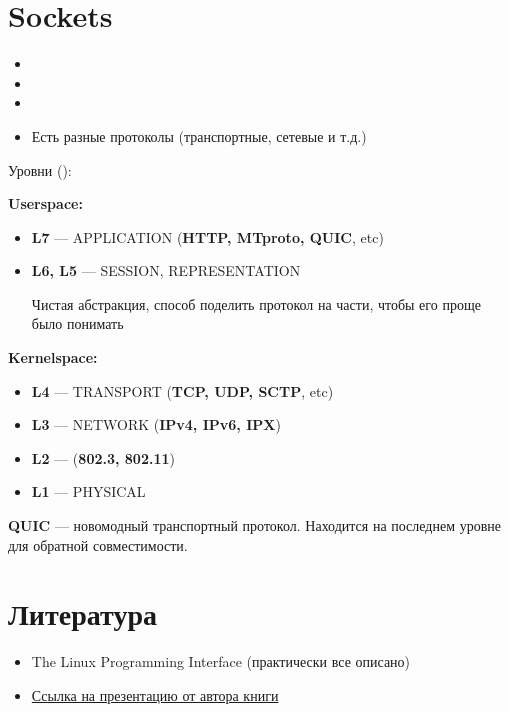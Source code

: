 \documentclass[../../lectures.tex]{subfiles}
\begin{document}
\newpage
\section{Sockets}
\begin{itemize}
    \item {}
    \item {}
    \item {}
    \item Есть разные протоколы (транспортные, сетевые и т.д.)
\end{itemize}
Уровни ():

\textbf{Userspace:}
\begin{itemize}
    \item \textbf{L7} --- APPLICATION (\textbf{HTTP, MTproto, QUIC}, etc)
    \item \textbf{L6, L5} --- SESSION, REPRESENTATION

          Чистая абстракция, способ поделить протокол на части, чтобы его проще было понимать
\end{itemize}

\textbf{Kernelspace:}
\begin{itemize}
    \item \textbf{L4} --- TRANSPORT (\textbf{TCP, UDP, SCTP}, etc)
    \item \textbf{L3} --- NETWORK (\textbf{IPv4, IPv6, IPX})
    \item \textbf{L2} ---  (\textbf{802.3, 802.11})
    \item \textbf{L1} --- PHYSICAL
\end{itemize}

\textbf{QUIC} --- новомодный транспортный протокол. Находится на последнем уровне для обратной совместимости.

\newpage
\section{Литература}
\begin{itemize}
    \item The Linux Programming Interface (практически все описано)
    \item \textcolor{blue}{
        \href{http://man7.org/conf/lca2013/IPC_Overview-LCA-2013-printable.pdf}{Ссылка на презентацию от автора книги}
    }
\end{itemize}
\end{document}
